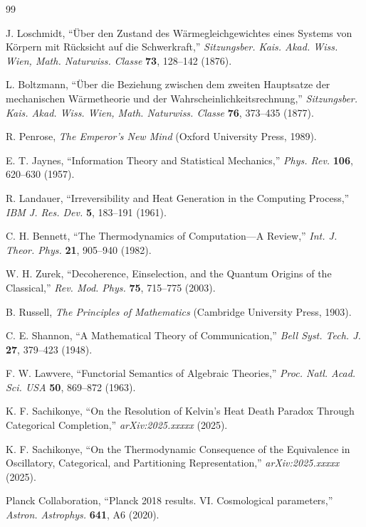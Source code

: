 \documentclass[twocolumn,10pt]{article}
\theoremstyle{definition}
\theoremstyle{remark}
\begin{document}
\begin{thebibliography}{99}

J. Loschmidt, ``Über den Zustand des Wärmegleichgewichtes eines Systems von Körpern mit Rücksicht auf die Schwerkraft,'' \textit{Sitzungsber. Kais. Akad. Wiss. Wien, Math. Naturwiss. Classe} \textbf{73}, 128--142 (1876).

L. Boltzmann, ``Über die Beziehung zwischen dem zweiten Hauptsatze der mechanischen Wärmetheorie und der Wahrscheinlichkeitsrechnung,'' \textit{Sitzungsber. Kais. Akad. Wiss. Wien, Math. Naturwiss. Classe} \textbf{76}, 373--435 (1877).

R. Penrose, \textit{The Emperor's New Mind} (Oxford University Press, 1989).

E. T. Jaynes, ``Information Theory and Statistical Mechanics,'' \textit{Phys. Rev.} \textbf{106}, 620--630 (1957).

R. Landauer, ``Irreversibility and Heat Generation in the Computing Process,'' \textit{IBM J. Res. Dev.} \textbf{5}, 183--191 (1961).

C. H. Bennett, ``The Thermodynamics of Computation—A Review,'' \textit{Int. J. Theor. Phys.} \textbf{21}, 905--940 (1982).

W. H. Zurek, ``Decoherence, Einselection, and the Quantum Origins of the Classical,'' \textit{Rev. Mod. Phys.} \textbf{75}, 715--775 (2003).

B. Russell, \textit{The Principles of Mathematics} (Cambridge University Press, 1903).

C. E. Shannon, ``A Mathematical Theory of Communication,'' \textit{Bell Syst. Tech. J.} \textbf{27}, 379--423 (1948).

F. W. Lawvere, ``Functorial Semantics of Algebraic Theories,'' \textit{Proc. Natl. Acad. Sci. USA} \textbf{50}, 869--872 (1963).

K. F. Sachikonye, ``On the Resolution of Kelvin's Heat Death Paradox Through Categorical Completion,'' \textit{arXiv:2025.xxxxx} (2025).

K. F. Sachikonye, ``On the Thermodynamic Consequence of the Equivalence in Oscillatory, Categorical, and Partitioning Representation,'' \textit{arXiv:2025.xxxxx} (2025).

Planck Collaboration, ``Planck 2018 results. VI. Cosmological parameters,'' \textit{Astron. Astrophys.} \textbf{641}, A6 (2020).


\end{thebibliography}
\end{document}
